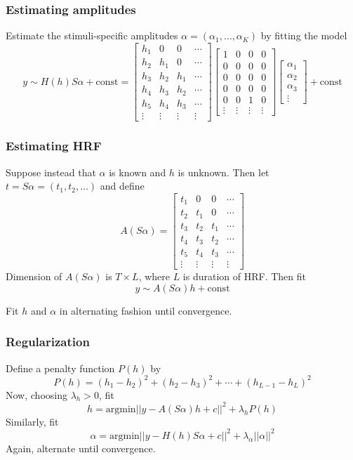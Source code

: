 \documentclass{beamer}
\begin{document}
\begin{frame}
\frametitle{Estimating amplitudes}

Estimate the stimuli-specific amplitudes $\alpha = (\alpha_1,\hdots,\alpha_K)$ by fitting the model
\[
y \sim H(h) S \alpha  + \text{const}= \begin{bmatrix}
h_1 & 0 & 0 & \cdots\\
h_2 & h_1 & 0 & \cdots\\
h_3 & h_2 & h_1 & \cdots\\
h_4 & h_3 & h_2 & \cdots\\
h_5 & h_4 & h_3 & \cdots\\
\vdots & \vdots & \vdots & \vdots
\end{bmatrix}
\begin{bmatrix}
1 & 0 & 0 & 0\\
0 & 0 & 0 & 0\\
0 & 0 & 0 & 0\\
0 & 0 & 0 & 0\\
0 & 0 & 1 & 0\\
\vdots & \vdots & \vdots & \vdots
\end{bmatrix}
\begin{bmatrix}
\alpha_1\\\alpha_2\\\alpha_3\\\vdots
\end{bmatrix}  + \text{const}
\]

\end{frame}


\begin{frame}
\frametitle{Estimating HRF}
Suppose instead that $\alpha$ is known and $h$ is unknown.  Then let $t = S\alpha = (t_1,t_2,\hdots)$ and define
\[
A(S\alpha) = \begin{bmatrix}
t_1 & 0 & 0 & \cdots\\
t_2 & t_1 & 0 & \cdots\\
t_3 & t_2 & t_1 & \cdots\\
t_4 & t_3 & t_2 & \cdots\\
t_5 & t_4 & t_3 & \cdots\\
\vdots & \vdots & \vdots & \vdots
\end{bmatrix}
\]
Dimension of $A(S\alpha)$ is $T \times L$, where $L$ is duration of HRF.
Then fit
\[
y \sim A(S\alpha) h + \text{const}
\]

Fit $h$ and $\alpha$ in alternating fashion until convergence.
\end{frame}

\begin{frame}
\frametitle{Regularization}
Define a penalty function $P(h)$ by 
\[P(h) = (h_1-h_2)^2 + (h_2-h_3)^2 + \cdots + (h_{L-1}-h_L)^2\]
Now, choosing $\lambda_h > 0$, fit
\[
h = \text{argmin} ||y - A(S\alpha) h + c||^2 + \lambda_h P(h)
\]
Similarly, fit
\[
\alpha = \text{argmin} ||y - H(h)S\alpha + c||^2 + \lambda_\alpha ||\alpha||^2
\]
Again, alternate until convergence.

\end{frame}
\end{document}

